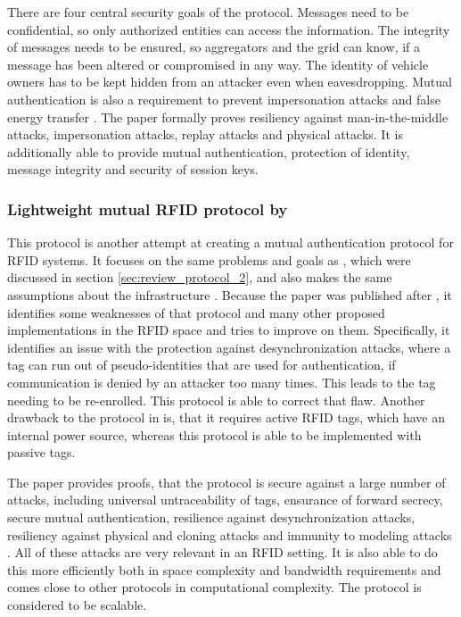 There are four central security goals of the protocol.
Messages need to be confidential, so only authorized entities can access the information.
The integrity of messages needs to be ensured, so aggregators and the grid can know, if a message has been altered or
compromised in any way. The identity of vehicle owners has to be kept hidden from an attacker even when eavesdropping.
Mutual authentication is also a requirement to prevent impersonation attacks and false energy transfer \cite[][p. 7237]{Bansal2020}.
The paper formally proves resiliency against man-in-the-middle attacks, impersonation attacks, replay attacks and
physical attacks. It is additionally able to provide mutual authentication, protection of identity, message integrity
and security of session keys. \cite[][p. 7243]{Bansal2020}

\subsubsection{Lightweight mutual RFID protocol by \citeauthor*{Zhu2019}}
\label{sec:review_protocol_6}

This protocol is another attempt at creating a mutual authentication protocol for RFID systems.
It focuses on the same problems and goals as \cite{Gope2018}, which were discussed
in section \ref{sec:review_protocol_2}, and also makes the same assumptions about the infrastructure \cite[][p. 1, 5]{Zhu2019}.
Because the paper was published after \cite{Gope2018}, it identifies some weaknesses of that protocol and
many other proposed implementations in the RFID space and tries to improve on them.
Specifically, it identifies an issue with the protection against desynchronization attacks,
where a tag can run out of pseudo-identities that are used for authentication, if communication
is denied by an attacker too many times. This leads to the tag needing to be re-enrolled.
This protocol is able to correct that flaw. \cite[][p. 4]{Zhu2019}
Another drawback to the protocol in \cite{Gope2018} is, that it requires active RFID tags, which have an
internal power source, whereas this protocol is able to be implemented with passive tags. \cite[][p. 18]{Zhu2019}

The paper provides proofs, that the protocol is secure against a large number of attacks, including
universal untraceability of tags, ensurance of forward secrecy, secure mutual authentication,
resilience against desynchronization attacks, resiliency against physical and cloning attacks and immunity
to modeling attacks \cite[][p. 12-15]{Zhu2019}.
All of these attacks are very relevant in an RFID setting.
It is also able to do this more efficiently both in space complexity and bandwidth requirements and
comes close to other protocols in computational complexity.
The protocol is considered to be scalable. \cite[][p. 16]{Zhu2019}

